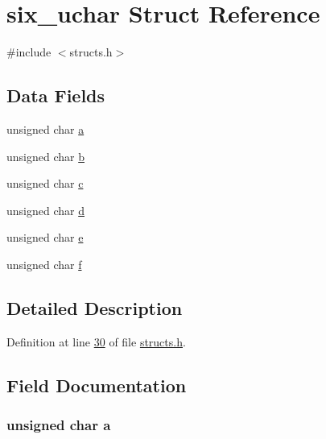 \hypertarget{structsix__uchar}{}\section{six\+\_\+uchar Struct Reference}
\label{structsix__uchar}


{\ttfamily \#include $<$structs.\+h$>$}

\subsection*{Data Fields}
\begin{DoxyCompactItemize}
\item 
unsigned char \hyperlink{structsix__uchar_a24420a9beaac7cee08b5e255a4c29db1}{a}
\item 
unsigned char \hyperlink{structsix__uchar_a41cede1b4c0d05cff170ad5761f70964}{b}
\item 
unsigned char \hyperlink{structsix__uchar_a089aacf63ed94ae0e667bb8f6db3e853}{c}
\item 
unsigned char \hyperlink{structsix__uchar_aef7bd9bb1f716afb151a4b4206d468f3}{d}
\item 
unsigned char \hyperlink{structsix__uchar_a78b0af8eb57f2f240016ee37529c6f47}{e}
\item 
unsigned char \hyperlink{structsix__uchar_a7ceb8bf372a716e22ab056d1b7df49e7}{f}
\end{DoxyCompactItemize}


\subsection{Detailed Description}


Definition at line \hyperlink{structs_8h_source_l00030}{30} of file \hyperlink{structs_8h_source}{structs.\+h}.



\subsection{Field Documentation}
\subsubsection[{\texorpdfstring{a}{a}}]{\setlength{\rightskip}{0pt plus 5cm}unsigned char a}\hypertarget{structsix__uchar_a24420a9beaac7cee08b5e255a4c29db1}{}\label{structsix__uchar_a24420a9beaac7cee08b5e255a4c29db1}


